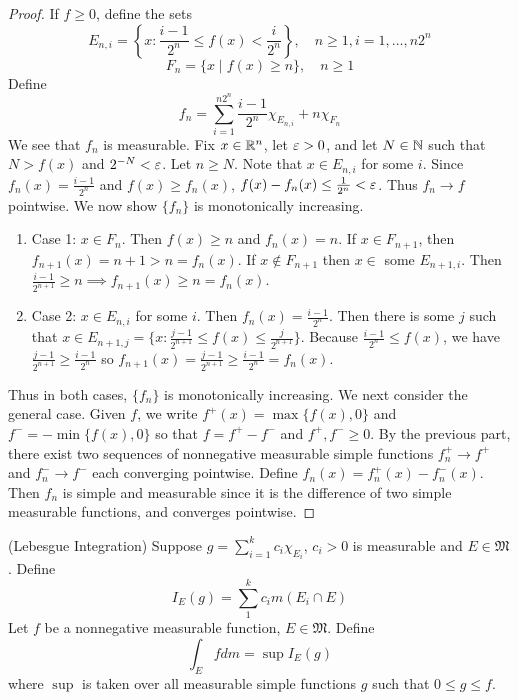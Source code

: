 \documentclass[11pt]{article}
\begin{document}
\begin{proof}
  \renewcommand{\qedsymbol}{\ensuremath{\blacksquare}}
    If $f \ge 0$, define the sets $$E_{n, i} = \left \{ x : \frac{i - 1}{2^n} \le f(x) < \frac{i}{2^n} \right \}, \quad n \ge 1, i = 1, \dots, n2^n$$ $$F_n = \{ x \mid f(x) \ge n \}, \quad n \ge 1$$Define $$f_n = \sum_{i = 1}^{n2^n} \frac{i - 1}{2^n} \chi_{E_{n, i}} + n \chi_{F_n}$$ We see that $f_n$ is measurable. Fix $x \in \mathbb{R}^n$, let $\varepsilon > 0$, and let $N \in \mathbb{N}$ such that $N > f(x)$ and $2^{-N} < \varepsilon$. Let $n \ge N$. Note that $x \in E_{n, i}$ for some $i$. Since $f_n(x) = \frac{i - 1}{2^n}$ and $f(x) \ge f_n(x)$, $f(x) - f_n(x) \le \frac{1}{2^n} < \varepsilon$. Thus $f_n \to f$ pointwise. We now show $\{ f_n \} $ is monotonically increasing. 
    \begin{enumerate}
        \item Case 1: $x \in F_n$. Then $f(x) \ge n$ and $f_n(x) = n$. If $x \in F_{n + 1}$, then $f_{n + 1}(x) = n + 1 > n = f_n(x)$. If $x \notin F_{n + 1}$ then $x \in$ some $E_{n+1, i}$. Then $\frac{i - 1}{2^{n + 1}} \ge n \implies f_{n + 1}(x) \ge n = f_n(x)$.
        \item Case 2: $x \in E_{n, i}$ for some $i$. Then $f_n(x) = \frac{i - 1}{2^n}$. Then there is some $j$ such that $x \in E_{n + 1, j} = \{ x : \frac{j - 1}{2^{n + 1}} \le f(x) \le \frac{j}{2^{n + 1}} \} $. Because $\frac{i - 1}{2^n} \le f(x)$, we have $\frac{j - 1}{2^{n + 1}} \ge \frac{i - 1}{2^n}$ so $f_{n + 1}(x) = \frac{j - 1}{2^{n + 1}} \ge \frac{i - 1}{2^n} = f_n (x)$.
    \end{enumerate}
    Thus in both cases, $\{ f_n \}$ is monotonically increasing. We next consider the general case. Given $f$, we write $f^+(x) = \max \{ f(x), 0 \}$ and $f^- = - \min \{ f(x), 0 \}$ so that $f = f^+ - f^-$ and $f^+, f^- \ge 0$. By the previous part, there exist two sequences of nonnegative measurable simple functions $f_n^+ \to f^+$ and $f_n^- \to f^-$ each converging pointwise. Define $f_n(x) = f_n^+(x) - f_n^-(x)$. Then $f_n$ is simple and measurable since it is the difference of two simple measurable functions, and converges pointwise.
  \end{proof}

  \begin{definition} (Lebesgue Integration)
    Suppose $g = \sum_{i = 1}^k c_i\chi_{E_i}$, $c_i > 0$ is measurable and $E \in \mathfrak{M}$. Define $$I_E(g) = \sum_1^k c_i m(E_i \cap E)$$ Let $f$ be a nonnegative measurable function, $E \in \mathfrak{M}$. Define $$\int_E f dm = \sup I_E(g)$$ where $\sup$ is taken over all measurable simple functions $g$ such that $0 \le g \le f$.
  \end{definition}
\end{document}
